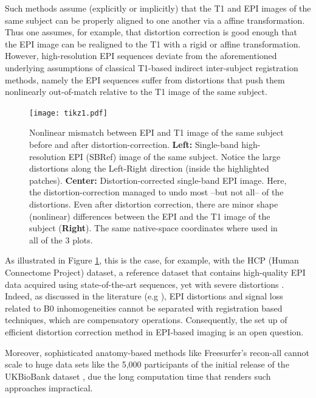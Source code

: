 Such methods assume (explicitly or implicitly) that the T1 and EPI images
of the same subject can be properly aligned to one another via a affine transformation.
Thus one assumes, for example, that distortion correction is
good enough that the EPI image can be realigned to the T1 with a rigid or affine
transformation. However, high-resolution EPI sequences deviate from the
aforementioned underlying assumptions of classical T1-based indirect inter-subject
registration methods, namely the EPI sequences suffer from distortions
that push them nonlinearly out-of-match relative to the T1 image of
the same subject. 
%
\begin{figure}[!htbp]
     \texttt{[image: tikz1.pdf]}
\caption{Nonlinear mismatch between EPI and T1 image of
  the same subject before and after distortion-correction.
\textbf{Left:} Single-band high-resolution EPI (SBRef) image of the
same subject. Notice the large distortions along the Left-Right direction
(inside the highlighted patches). \textbf{Center:} Distortion-corrected
single-band EPI image. Here, the distortion-correction managed to undo
most --but not all-- of the distortions. Even after distortion
correction, there are minor shape (nonlinear) differences between the
EPI and the T1 image of the subject (\textbf{Right}). The same native-space
coordinates where used in all of the 3 plots.}
\label{fig:pb_fig}
\end{figure}

As illustrated in Figure \ref{fig:pb_fig}, this is the case, for
example, with the HCP (Human Connectome Project)
\citep{VanEssen20122222} dataset, a reference dataset that contains
high-quality EPI data acquired using state-of-the-art sequences, yet
with severe distortions
\citep{pmid9178246,pmid12270226,zeng2002,anderson2003}.
%
Indeed, as discussed in the literature (e.g \citep{pmid12071618}), EPI
distortions and signal loss related to B0 inhomogeneities cannot be
separated with registration based techniques, which are compensatory
operations.  Consequently, the set up of efficient distortion
correction method in EPI-based imaging is an open question.

Moreover, sophisticated anatomy-based methods like Freesurfer's
recon-all cannot scale to huge data sets like the 5,000 participants
of the initial release of the UKBioBank dataset \citep{Miller2016}, due
the long computation time 
%
that renders such approaches impractical.

